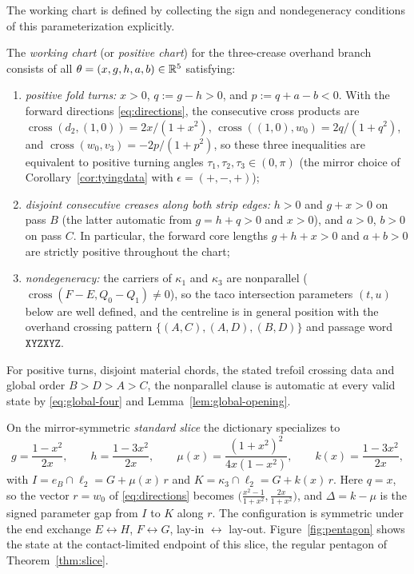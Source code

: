 The working chart is defined by collecting the sign and nondegeneracy conditions of this parameterization explicitly.

\begin{definition}\label{def:chart}
The \emph{working chart} (or \emph{positive chart}) for the three-crease overhand branch consists of all $\theta=(x,g,h,a,b)\in\mathbb{R}^5$ satisfying:
\begin{enumerate}
\item[(i)] \emph{positive fold turns:} $x>0$, $q:=g-h>0$, and $p:=q+a-b<0$. With the forward directions \eqref{eq:directions}, the consecutive cross products are $\operatorname{cross}(d_2,(1,0))=2x/(1+x^2)$, $\operatorname{cross}((1,0),w_0)=2q/(1+q^2)$, and $\operatorname{cross}(w_0,v_3)=-2p/(1+p^2)$, so these three inequalities are equivalent to positive turning angles $\tau_1,\tau_2,\tau_3\in(0,\pi)$ (the mirror choice of Corollary~\textup{\ref{cor:tyingdata}} with $\epsilon=(+,-,+)$);
\item[(ii)] \emph{disjoint consecutive creases along both strip edges:} $h>0$ and $g+x>0$ on pass $B$ (the latter automatic from $g=h+q>0$ and $x>0$), and $a>0$, $b>0$ on pass $C$. In particular, the forward core lengths $g+h+x>0$ and $a+b>0$ are strictly positive throughout the chart;
\item[(iii)] \emph{nondegeneracy:} the carriers of $\kappa_1$ and $\kappa_3$ are nonparallel ($\operatorname{cross}(F-E,Q_0-Q_1)\neq0$), so the taco intersection parameters $(t,u)$ below are well defined, and the centreline is in general position with the overhand crossing pattern $\{(A,C),(A,D),(B,D)\}$ and passage word $\mathtt{XYZXYZ}$.
\end{enumerate}
For positive turns, disjoint material chords, the stated trefoil crossing data and global order $B>D>A>C$, the nonparallel clause is automatic at every valid state by \eqref{eq:global-four} and Lemma~\ref{lem:global-opening}.
\end{definition}

On the mirror-symmetric \emph{standard slice} the dictionary specializes to
\begin{equation}\label{eq:slice}
  g=\frac{1-x^2}{2x},\qquad h=\frac{1-3x^2}{2x},\qquad
  \mu(x)=\frac{(1+x^2)^2}{4x(1-x^2)},\qquad k(x)=\frac{1-3x^2}{2x},
\end{equation}
with $I=e_B\cap\ell_2=G+\mu(x)\,r$ and $K=\kappa_3\cap\ell_2=G+k(x)\,r$. Here $q=x$, so the vector $r=w_0$ of \eqref{eq:directions} becomes $\bigl(\tfrac{x^2-1}{1+x^2},\tfrac{2x}{1+x^2}\bigr)$, and $\Delta=k-\mu$ is the signed parameter gap from $I$ to $K$ along $r$. The configuration is symmetric under the end exchange $E\leftrightarrow H$, $F\leftrightarrow G$, lay-in $\leftrightarrow$ lay-out. Figure~\ref{fig:pentagon} shows the state at the contact-limited endpoint of this slice, the regular pentagon of Theorem~\ref{thm:slice}.


